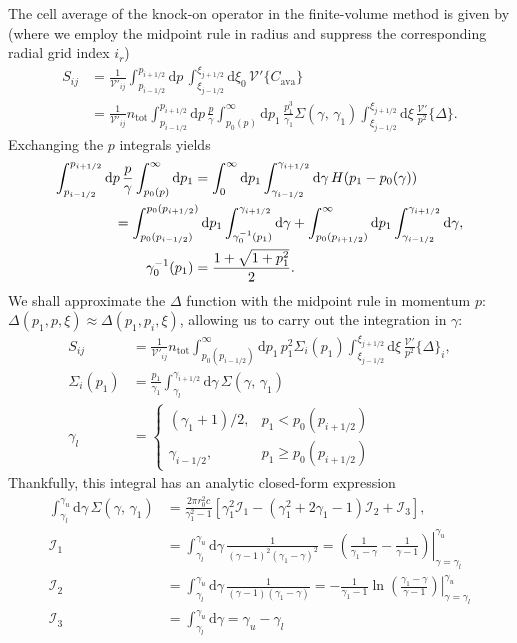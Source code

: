 \documentclass[11pt,a4paper]{article}
\newcommand{\rd}{\ensuremath{\mathrm{d}}}
\newcommand{\sub}[1]{\ensuremath{_{\text{#1}}}}
\newcommand{\Vp}{\ensuremath{\mathcal{V}'} }
\begin{document}
The cell average of the knock-on operator in the finite-volume method is given by (where we employ the midpoint rule in radius and suppress the corresponding radial grid index $i_r$)
\begin{align}
S_{ij} &= \frac{1}{\Vp_{ij}}\int_{p_{i-1/2}}^{p_{i+1/2}}\rd p \, \int_{\xi_{j-1/2}}^{\xi_{j+1/2}}\rd\xi_0\,\Vp\{C\sub{ava}\} \nonumber\\
&= \frac{1}{\Vp_{ij}}n\sub{tot} \int_{p_{i-1/2}}^{p_{i+1/2}}\rd p\,\frac{p}{\gamma} \int_{p_0(p)}^\infty\rd p_1 \,\frac{p_1^3}{\gamma_1}\Sigma(\gamma,\,\gamma_1)\int_{\xi_{j-1/2}}^{\xi_{j+1/2}} \rd \xi \,\frac{\Vp}{p^2}\{\Delta\}.
\end{align}
Exchanging the $p$ integrals yields
\begin{align}
 \int_{p_{i-1/2}}^{p_{i+1/2}}\rd p\,\frac{p}{\gamma} \int_{p_0(p)}^\infty\rd p_1 &=  \int_{0}^\infty\rd p_1 \int_{\gamma_{i-1/2}}^{\gamma_{i+1/2}}\rd \gamma \, H(p_1-p_0(\gamma))  \nonumber \\
 &\hspace{-20mm}= \int_{p_0(p_{i-1/2})}^{p_0(p_{i+1/2})}\rd p_1 \int_{\gamma_0^{-1}(p_1)}^{\gamma_{i+1/2}} \rd \gamma + \int_{p_0(p_{i+1/2})}^\infty\rd p_1 \int_{\gamma_{i-1/2}}^{\gamma_{i+1/2}}\rd \gamma, \\
\gamma_0^{-1}(p_1) &= \frac{1+\sqrt{1+p_1^2}}{2} .
\end{align}
We shall approximate the $\Delta$ function with the midpoint rule in momentum $p$: $\Delta(p_1,p,\xi) \approx \Delta(p_1,p_i,\xi)$, allowing us to carry out the integration in $\gamma$:
\begin{align}
S_{ij} &= \frac{1}{\Vp_{ij}}n\sub{tot}  \int_{p_0(p_{i-1/2})}^\infty\rd p_1 \,p_1^2\Sigma_i(p_1)\int_{\xi_{j-1/2}}^{\xi_{j+1/2}} \rd \xi \,\frac{\Vp}{p^2}\{\Delta\}_i, \nonumber\\
\Sigma_i(p_1) &= \frac{p_1}{\gamma_1}\int_{\gamma_l}^{\gamma_{i+1/2}}\rd\gamma\,\Sigma(\gamma,\,\gamma_1)\\
\gamma_l &= \begin{cases}
(\gamma_1+1)/2, & p_1 < p_0(p_{i+1/2}) \\
\gamma_{i-1/2}, & p_1 \geq p_0(p_{i+1/2})
\end{cases}
\end{align}
Thankfully, this integral has an analytic closed-form expression 
\begin{align}
\int_{\gamma_l}^{\gamma_u}  \rd \gamma \,\Sigma(\gamma,\,\gamma_1) &= \frac{2\pi r_0^2 c}{\gamma_1^2-1}\left[ \gamma_1^2 \mathcal{I}_1 - (\gamma_1^2+2\gamma_1-1)\mathcal{I}_2 + \mathcal{I}_3 \right], \nonumber \\
\mathcal{I}_1 &= \int_{\gamma_l}^{\gamma_u}  \rd \gamma \,\frac{1}{(\gamma-1)^2(\gamma_1-\gamma)^2} = \left.\left( \frac{1}{\gamma_1-\gamma} - \frac{1}{\gamma-1} \right) \right|_{\gamma=\gamma_l}^{\gamma_u}\nonumber \\
\mathcal{I}_2 &= \int_{\gamma_l}^{\gamma_u}  \rd \gamma \,\frac{1}{(\gamma-1)(\gamma_1-\gamma)} = -\frac{1}{\gamma_1-1} \left.\ln\left(\frac{\gamma_1-\gamma}{\gamma-1}\right)\right|_{\gamma=\gamma_l}^{\gamma_u} \nonumber \\
\mathcal{I}_3 &= \int_{\gamma_l}^{\gamma_u}  \rd \gamma  = \gamma_u - \gamma_l
\end{align}
\end{document}

